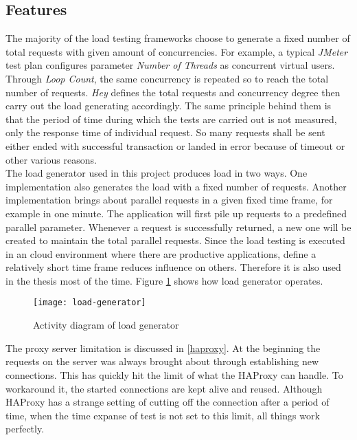 \subsection{Features}
\label{load generator}
The majority of the load testing frameworks choose to generate a fixed number of total requests with given amount of concurrencies.  For example, a typical \textit{JMeter} test plan configures parameter \textit{Number of Threads} as concurrent virtual users. Through \textit{Loop Count}, the same concurrency is repeated so to reach the total number of requests. \textit{Hey} defines the total requests and concurrency degree then carry out the load generating accordingly. The same principle behind them is that the period of time during which the tests are carried out is not measured, only the response time of individual request. So many requests shall be sent either ended with successful transaction or landed in error because of timeout or other various reasons. \\
The load generator used in this project produces load in two ways. One implementation also generates the load with a fixed number of requests. Another implementation brings about parallel requests in a given fixed time frame, for example in one minute. The application will first pile up requests to a predefined parallel parameter. Whenever a request is successfully returned, a new one will be created to maintain the total parallel requests. Since the load testing is executed in an cloud environment where there are productive applications, define a relatively short time frame reduces influence on others. Therefore it is also used in the thesis most of the time. Figure \ref{load-generator} shows how load generator operates.\\
 \begin{figure}[h]
	\centering
	\texttt{[image: load-generator]}
	\caption{Activity diagram of load generator}
	\label{load-generator}
\end{figure}
The proxy server limitation is discussed in \ref{haproxy}. At the beginning the requests on the server was always brought about through establishing new connections. This has quickly hit the limit of what the HAProxy can handle. To workaround it, the started connections are kept alive and reused. Although HAProxy has a strange setting of cutting off the connection after a period of time, when the time expanse of test is not set to this limit, all things work perfectly. 

